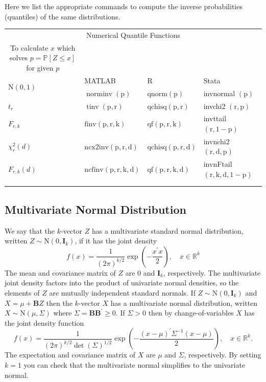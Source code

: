 \documentclass[10pt]{article}
\begin{document}
Here we list the appropriate commands to compute the inverse probabilities (quantiles) of the same distributions.

\begin{tabular}{|llll|}
\hline
\multicolumn{4}{c}{Numerical Quantile Functions} \\
\multicolumn{1}{c}{To calculate $x$ which solves $p=\mathbb{P}[Z \leq x]$ for given $p$} &  &  &  \\
\multirow{2}{*}{$\mathrm{N}(0,1)$} & MATLAB & $\mathrm{R}$ & Stata \\
\cline { 2 - 4 }
 & $\operatorname{norminv}(\mathrm{p})$ & $\mathrm{qnorm}(\mathrm{p})$ & invnormal $(\mathrm{p})$ \\
$t_{r}$ & $\operatorname{tinv}(\mathrm{p}, \mathrm{r})$ & $\mathrm{qchisq}(\mathrm{p}, \mathrm{r})$ & invchi2 $(\mathrm{r}, \mathrm{p})$ \\
$F_{r, k}$ & $\mathrm{finv}(\mathrm{p}, \mathrm{r}, \mathrm{k})$ & $\mathrm{qf}(\mathrm{p}, \mathrm{r}, \mathrm{k})$ & invttail $(\mathrm{r}, 1-\mathrm{p})$ \\
$\chi_{r}^{2}(d)$ & $\mathrm{ncx2inv}(\mathrm{p}, \mathrm{r}, \mathrm{d})$ & $\mathrm{qchisq}(\mathrm{p}, \mathrm{r}, \mathrm{d})$ & invnchi2 $(\mathrm{r}, \mathrm{d}, \mathrm{p})$ \\
$F_{r, k}(d)$ & $\mathrm{ncfinv}(\mathrm{p}, \mathrm{r}, \mathrm{k}, \mathrm{d})$ & $\mathrm{qf}(\mathrm{p}, \mathrm{r}, \mathrm{k}, \mathrm{d})$ & invnFtail $(\mathrm{r}, \mathrm{k}, \mathrm{d}, 1-\mathrm{p})$ \\
 &  &  &  \\
 &  &  &  \\
\hline
\end{tabular}

\subsection{Multivariate Normal Distribution}
We say that the $k$-vector $Z$ has a multivariate standard normal distribution, written $Z \sim \mathrm{N}\left(0, \boldsymbol{I}_{k}\right)$, if it has the joint density
$$
f(x)=\frac{1}{(2 \pi)^{k / 2}} \exp \left(-\frac{x^{\prime} x}{2}\right), \quad x \in \mathbb{R}^{k}
$$
The mean and covariance matrix of $Z$ are 0 and $\boldsymbol{I}_{k}$, respectively. The multivariate joint density factors into the product of univariate normal densities, so the elements of $Z$ are mutually independent standard normals. If $Z \sim \mathrm{N}\left(0, \boldsymbol{I}_{k}\right)$ and $X=\mu+\boldsymbol{B} Z$ then the $k$-vector $X$ has a multivariate normal distribution, written $X \sim \mathrm{N}(\mu, \Sigma)$ where $\Sigma=\boldsymbol{B} \boldsymbol{B}^{\prime} \geq 0$. If $\Sigma>0$ then by change-of-variables $X$ has the joint density function
$$
f(x)=\frac{1}{(2 \pi)^{k / 2} \operatorname{det}(\Sigma)^{1 / 2}} \exp \left(-\frac{(x-\mu)^{\prime} \Sigma^{-1}(x-\mu)}{2}\right), \quad x \in \mathbb{R}^{k} .
$$
The expectation and covariance matrix of $X$ are $\mu$ and $\Sigma$, respectively. By setting $k=1$ you can check that the multivariate normal simplifies to the univariate normal.
\end{document}
